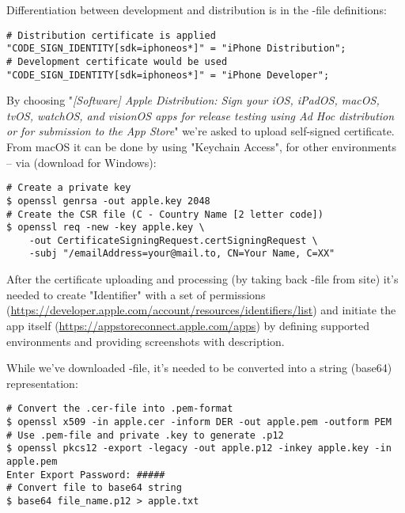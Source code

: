 Differentiation between development and distribution is in the -file definitions:

\begin{lstlisting}[language=terminal]
# Distribution certificate is applied
"CODE_SIGN_IDENTITY[sdk=iphoneos*]" = "iPhone Distribution";
# Development certificate would be used
"CODE_SIGN_IDENTITY[sdk=iphoneos*]" = "iPhone Developer";
\end{lstlisting}

\noindent By choosing "\emph{[Software] Apple Distribution: Sign your iOS, iPadOS, macOS, tvOS, watchOS, and visionOS 
apps for release testing using Ad Hoc distribution or for submission to the App Store}" we're asked to upload self-signed 
certificate. From macOS it can be done by using "Keychain Access", for other environments -- via  (download 
 for Windows):

\begin{lstlisting}[language=terminal]
# Create a private key
$ openssl genrsa -out apple.key 2048
# Create the CSR file (C - Country Name [2 letter code])
$ openssl req -new -key apple.key \ 
    -out CertificateSigningRequest.certSigningRequest \
    -subj "/emailAddress=your@mail.to, CN=Your Name, C=XX"
\end{lstlisting}

\noindent After the certificate uploading and processing (by taking back -file from site) it's needed to create 
"Identifier" with a set of permissions 
(\href{https://developer.apple.com/account/resources/identifiers/list}{https://developer.apple.com/account/resources/identifiers/list})
and initiate the app itself 
(\href{https://appstoreconnect.apple.com/apps}{https://appstoreconnect.apple.com/apps}) by defining supported 
environments and providing screenshots with description.

While we've downloaded -file, it's needed to be converted into a string (base64) representation:

\begin{lstlisting}[language=terminal]
# Convert the .cer-file into .pem-format
$ openssl x509 -in apple.cer -inform DER -out apple.pem -outform PEM
# Use .pem-file and private .key to generate .p12
$ openssl pkcs12 -export -legacy -out apple.p12 -inkey apple.key -in apple.pem
Enter Export Password: #####
# Convert file to base64 string
$ base64 file_name.p12 > apple.txt
\end{lstlisting}

